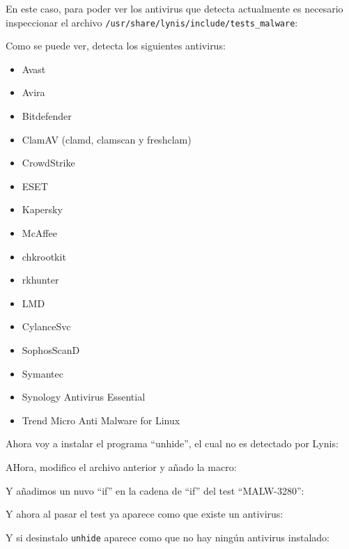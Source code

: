 \documentclass{article}
\begin{document}
En este caso, para poder ver los antivirus que detecta actualmente es necesario inspeccionar el archivo \verb|/usr/share/lynis/include/tests_malware|:


Como se puede ver, detecta los siguientes antivirus: 

\begin{itemize}
    \item Avast
    \item Avira
    \item Bitdefender
    \item ClamAV (clamd, clamscan y freshclam)
    \item CrowdStrike
    \item ESET
    \item Kapersky
    \item McAffee
    \item chkrootkit
    \item rkhunter
    \item LMD
    \item CylanceSvc
    \item SophosScanD
    \item Symantec
    \item Synology Antivirus Essential
    \item Trend Micro Anti Malware for Linux
\end{itemize}

Ahora voy a instalar el programa ``unhide'', el cual no es detectado por Lynis:


AHora, modifico el archivo anterior y añado la macro:


Y añadimos un nuvo ``if'' en la cadena de ``if'' del test ``MALW-3280'':


Y ahora al pasar el test ya aparece como que existe un antivirus:


Y si desinstalo \verb|unhide| aparece como que no hay ningún antivirus instalado:

\end{document}
